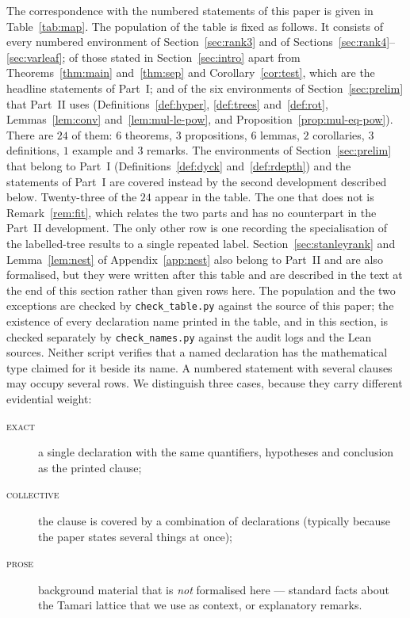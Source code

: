 \documentclass[11pt,a4paper]{article}
\theoremstyle{plain}
\theoremstyle{definition}
\begin{document}
The correspondence with the numbered statements of this paper is given in
Table~\ref{tab:map}. The population of the table is fixed as follows. It consists of
every numbered environment of Section~\ref{sec:rank3} and of
Sections~\ref{sec:rank4}--\ref{sec:varleaf}; of those stated in
Section~\ref{sec:intro} apart from Theorems~\ref{thm:main} and~\ref{thm:sep} and
Corollary~\ref{cor:test}, which are the headline statements of Part~I; and of the
six environments of Section~\ref{sec:prelim} that Part~II uses
(Definitions~\ref{def:hyper}, \ref{def:trees} and~\ref{def:rot},
Lemmas~\ref{lem:conv} and~\ref{lem:mul-le-pow}, and
Proposition~\ref{prop:mul-eq-pow}). There are $24$ of them: $6$ theorems,
$3$ propositions, $6$ lemmas, $2$ corollaries, $3$ definitions, $1$ example and
$3$ remarks. The environments of Section~\ref{sec:prelim} that belong to Part~I
(Definitions~\ref{def:dyck} and~\ref{def:rdepth}) and the statements of Part~I are
covered instead by the second development described below. Twenty-three of the $24$
appear in the table. The one that does not is Remark~\ref{rem:fit}, which relates the
two parts and has no counterpart in the Part~II development. The
only other row is one recording the specialisation of the labelled-tree results to a
single repeated label. Section~\ref{sec:stanleyrank} and Lemma~\ref{lem:nest} of
Appendix~\ref{app:nest} also belong to Part~II and are also formalised, but they were
written after this table and are described in the text at the end of this section rather
than given rows here. The population and the two exceptions are checked by \verb|check_table.py| against the
source of this paper; the existence of every declaration name printed in the table, and
in this section, is checked separately by \verb|check_names.py| against the audit logs
and the Lean sources. Neither script verifies that a named declaration has the
mathematical type claimed for it beside its name. A numbered statement with
several clauses may occupy several rows. We distinguish three cases, because they
carry different evidential weight:
\begin{description}
\item[\textnormal{\textsc{exact}}] a single declaration with the same quantifiers,
      hypotheses and conclusion as the printed clause;
\item[\textnormal{\textsc{collective}}] the clause is covered by a combination of
      declarations (typically because the paper states several things at once);
\item[\textnormal{\textsc{prose}}] background material that is \emph{not} formalised
      here --- standard facts about the Tamari lattice that we use as context, or
      explanatory remarks.
\end{description}
\end{document}

